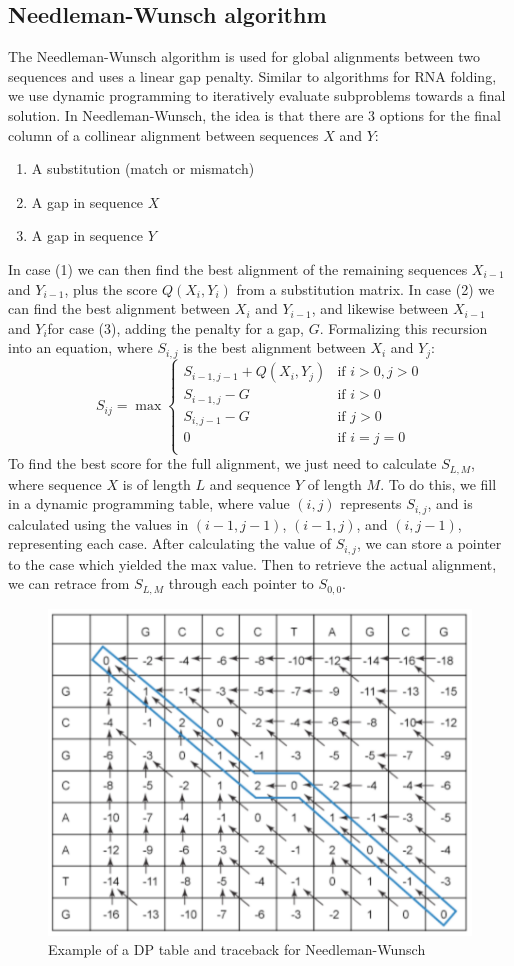 \documentclass[12pt]{article}
\begin{document}
\subsection{Needleman-Wunsch algorithm}
The Needleman-Wunsch algorithm is used for global alignments between two sequences and uses a linear gap penalty. Similar to algorithms for RNA folding, we use dynamic programming to iteratively evaluate subproblems towards a final solution. In Needleman-Wunsch, the idea is that there are 3 options for the final column of a collinear alignment between sequences $X$ and $Y$:
\begin{enumerate}
    \item A substitution (match or mismatch)
    \item A gap in sequence $X$ 
    \item A gap in sequence $Y$ 
\end{enumerate}
In case (1) we can then find the best alignment of the remaining sequences $X_{i-1}$ and $Y_{i-1}$, plus the score $Q(X_i,Y_i)$ from a substitution matrix. In case (2) we can find the best alignment between $X_{i}$ and $Y_{i-1}$, and likewise between $X_{i-1}$ and $Y_{i} $for case (3), adding the penalty for a gap, $G$. Formalizing this recursion into an equation, where $S_{i,j}$ is the best alignment between $X_i$ and $Y_j$:
\begin{equation*}
S_{ij} = \max\begin{cases}
S_{i-1, j-1} + Q(X_i,Y_j) &\text{if }i>0, j>0\\
S_{i-1, j} - G &\text{if }i>0\\
S_{i, j-1} - G &\text{if }j>0\\
0 &\text{if }i=j=0\\
\end{cases}
\end{equation*}
To find the best score for the full alignment, we just need to calculate $S_{L,M}$, where sequence $X$ is of length $L$ and sequence $Y$ of length $M$. To do this, we fill in a dynamic programming table, where value $(i,j)$ represents $S_{i,j}$, and is calculated using the values in $(i-1,j-1)$, $(i-1,j)$, and $(i,j-1)$, representing each case. After calculating the value of $S_{i,j}$, we can store a pointer to the case which yielded the max value. Then to retrieve the actual alignment, we can retrace from $S_{L,M}$ through each pointer to $S_{0,0}$.
\begin{figure}[h]
    \centering
    \includegraphics[width=.6\linewidth]{needleman.png}
    \caption{Example of a DP table and traceback for Needleman-Wunsch}
    \label{fig:needle}
\end{figure}
\end{document}
